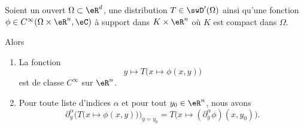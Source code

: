 \begin{proposition}     \label{PROPooCNYTooWCKHpV}
    Soient un ouvert \( \Omega\subset \eR^d\), une distribution \( T\in \swD'(\Omega)\) ainsi qu'une fonction \( \phi\in C^{\infty}(\Omega\times \eR^n,\eC)\) à support dans \( K\times \eR^n\) où \( K\) est compact dans \( \Omega\).

    Alors
    \begin{enumerate}
        \item
            La fonction
            \begin{equation}
                y\mapsto T\big( x\mapsto\phi(x,y) \big)
            \end{equation}
            est de classe \(  C^{\infty}\) sur \( \eR^n\).
        \item
            Pour toute liste d'indices \( \alpha\) et pour tout \( y_0\in \eR^n\), nous avons
            \begin{equation}        \label{EQooYMXXooYkceTv}
\partial_y^{\alpha}\big( T\big( x\mapsto \phi(x,y) \big) \big)_{y=y_0}= T\big( x\mapsto(\partial_{y}^{\alpha}\phi)(x,y_0) \big).
            \end{equation}
    \end{enumerate}
\end{proposition}

